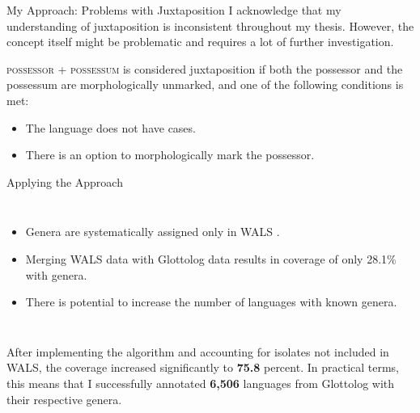 \documentclass[12pt,aspectratio=169,t]{beamer}
\renewcommand{\'}{\textquotesingle}
\begin{document}
\begin{frame}{My Approach: Problems with Juxtaposition}
	I acknowledge that my understanding of juxtaposition is inconsistent throughout my thesis. However, the concept itself might be problematic and requires a lot of further investigation.
	
	\textsc{possessor + possessum} is considered juxtaposition if both the possessor and the possessum are morphologically unmarked, and one of the following conditions is met:
	
	\begin{itemize}
		\item The language does not have cases.
		\item There is an option to morphologically mark the possessor.
	\end{itemize}
	
\end{frame}


\begin{frame}{Applying the Approach}
	\begin{columns}
		\begin{itemize}
			\item Genera are systematically assigned only in WALS \citep{wals}.
			\item Merging WALS data with Glottolog data results in coverage of only 28.1\% with genera.
			\item There is potential to increase the number of languages with known genera.
		\end{itemize}
		
		\pause
		
		
	\end{columns}
	
	\pause
	
	After implementing the algorithm and accounting for isolates not included in WALS, the coverage increased significantly to \textbf{75.8} percent. In practical terms, this means that I successfully annotated \textbf{6,506} languages from Glottolog with their respective genera.
	
\end{frame}
\end{document}
